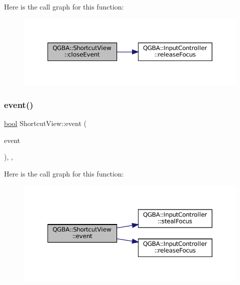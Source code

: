 Here is the call graph for this function\+:
\nopagebreak
\begin{figure}[H]
\begin{center}
\leavevmode
\includegraphics[width=350pt]{class_q_g_b_a_1_1_shortcut_view_a228fca2c7dc1503552ea59fe6ea8c5ed_cgraph}
\end{center}
\end{figure}
\mbox{\label{class_q_g_b_a_1_1_shortcut_view_a31598608a4b51fb333aeaee34863e280}} 
\subsubsection{\texorpdfstring{event()}{event()}}
{\footnotesize\ttfamily \mbox{\hyperlink{libretro_8h_a4a26dcae73fb7e1528214a068aca317e}{bool}} Shortcut\+View\+::event (\begin{DoxyParamCaption}\item[{Q\+Event $\ast$}]{event }\end{DoxyParamCaption})\hspace{0.3cm}{\ttfamily [override]}, {\ttfamily [protected]}, {\ttfamily [virtual]}}

Here is the call graph for this function\+:
\nopagebreak
\begin{figure}[H]
\begin{center}
\leavevmode
\includegraphics[width=350pt]{class_q_g_b_a_1_1_shortcut_view_a31598608a4b51fb333aeaee34863e280_cgraph}
\end{center}
\end{figure}
\mbox{\label{class_q_g_b_a_1_1_shortcut_view_ae57eea13c43f836bff537d70a50ffc90}} 
